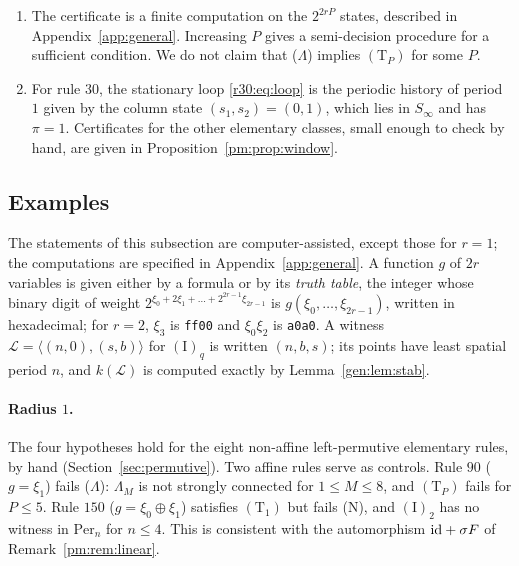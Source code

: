 \begin{remark}\label{gen:rem:TPimpl}
\begin{enumerate}
\item The certificate is a finite computation on the $2^{2rP}$ states, described in Appendix~\ref{app:general}. Increasing $P$ gives a semi-decision procedure for a sufficient condition. We do not claim that ($\Lambda$) implies $(\mathrm T_P)$ for some $P$.
\item For rule $30$, the stationary loop \eqref{r30:eq:loop} is the periodic history of period $1$ given by the column state $(s_1,s_2)=(0,1)$, which lies in $S_\infty$ and has $\pi=1$. Certificates for the other elementary classes, small enough to check by hand, are given in Proposition~\ref{pm:prop:window}.
\end{enumerate}
\end{remark}

\subsection{Examples}\label{gen:sec:examples}

The statements of this subsection are computer-assisted, except those for $r=1$; the computations are specified in Appendix~\ref{app:general}. A function $g$ of $2r$ variables is given either by a formula or by its \emph{truth table}, the integer whose binary digit of weight $2^{\xi_0+2\xi_1+\dots+2^{2r-1}\xi_{2r-1}}$ is $g(\xi_0,\dots,\xi_{2r-1})$, written in hexadecimal; for $r=2$, $\xi_3$ is \texttt{ff00} and $\xi_0\xi_2$ is \texttt{a0a0}. A witness $\mathcal L=\langle(n,0),(s,b)\rangle$ for $(\mathrm I)_q$ is written $(n,b,s)$; its points have least spatial period $n$, and $k(\mathcal L)$ is computed exactly by Lemma~\ref{gen:lem:stab}.

\paragraph{Radius $1$.} The four hypotheses hold for the eight non-affine left-permutive elementary rules, by hand (Section~\ref{sec:permutive}). Two affine rules serve as controls. Rule $90$ ($g=\xi_1$) fails \textup{($\Lambda$)}: $\Lambda_M$ is not strongly connected for $1\le M\le8$, and $(\mathrm T_P)$ fails for $P\le5$. Rule $150$ ($g=\xi_0\oplus\xi_1$) satisfies $(\mathrm T_1)$ but fails \textup{(N)}, and $(\mathrm I)_2$ has no witness in $\mathrm{Per}_n$ for $n\le4$. This is consistent with the automorphism $\mathrm{id}+\sigma F$ of Remark~\ref{pm:rem:linear}.

